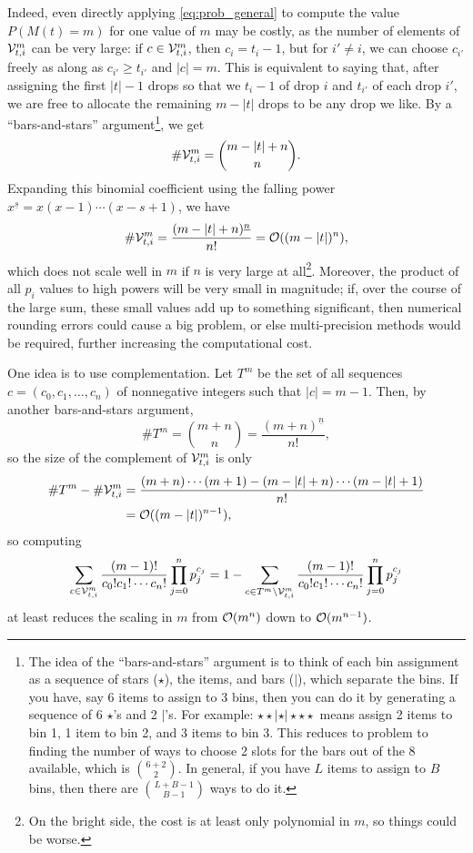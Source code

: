 \documentclass[letterpaper]{article}
\begin{document}
	Indeed, even directly applying \eqref{eq:prob_general} to compute the value $P(M(t){=}m)$ for one value of $m$ may be costly, as the number of elements of $\mathcal{V}_{t, i}^{m}$ can be very large: if $c\in\mathcal{V}_{t, i}^{m}$, then $c_i = t_i - 1$, but for $i' \ne i$, we can choose $c_{i'}$ freely as along as $c_{i'} \ge t_{i'}$ and $|c| = m$. This is equivalent to saying that, after assigning the first $|t|-1$ drops so that we $t_i-1$ of drop $i$ and $t_{i'}$ of each drop $i'$, we are free to allocate the remaining $m-|t|$ drops to be any drop we like. By a ``bars-and-stars'' argument\footnote{The idea of the ``bars-and-stars'' argument is to think of each bin assignment as a sequence of stars ($\star$), the items, and bars ($|$), which separate the bins. If you have, say 6 items to assign to 3 bins, then you can do it by generating a sequence of 6 $\star$'s and 2 $|$'s. For example: $\star\star|\star|\star\star \star$ means assign 2 items to bin 1, 1 item to bin 2, and 3 items to bin 3. This reduces to problem to finding the number of ways to choose 2 slots for the bars out of the 8 available, which is $\binom{6+2}{2}$. In general, if you have $L$ items to assign to $B$ bins, then there are $\binom{L+B-1}{B-1}$ ways to do it.}, we get
	\begin{equation}
		\#\mathcal{V}_{t, i}^{m} = \binom{m-|t| + n}{n}.
	\end{equation}
	Expanding this binomial coefficient using the falling power ${x^{\underline{s}} = x(x-1)\cdots (x-s+1)}$, we have
	\begin{equation*}
		\#\mathcal{V}_{t, i}^{m} = \frac{(m-|t|+n)^{\underline{n}}}{n!} = \mathcal{O}((m-|t|)^n),
	\end{equation*}
	which does not scale well in $m$ if $n$ is very large at all\footnote{On the bright side, the cost is at least only polynomial in $m$, so things could be worse.}. Moreover, the product of all $p_i$ values to high powers will be very small in magnitude; if, over the course of the large sum, these small values add up to something significant, then numerical rounding errors could cause a big problem, or else multi-precision methods would be required, further increasing the computational cost.
	
	One idea is to use complementation. Let $T^m$ be the set of all sequences $c = (c_0,c_1,\dots, c_n)$ of nonnegative integers such that $|c|= m-1$. Then, by another bars-and-stars argument,
	\begin{equation*}
		\#T^m = \binom{m + n}{n} = \frac{(m+n)^{\underline{n}}}{n!},
	\end{equation*}
	so the size of the complement of $\mathcal{V}_{t, i}^{m}$ is only
	\begin{align*}
		\#T^m - \#\mathcal{V}_{t, i}^{m} &= \frac{(m+n)\cdots (m+1) - (m-|t|+n)\cdots(m-|t|+1)}{n!} \\
		&= \mathcal{O}((m-|t|)^{n-1}),
	\end{align*}
	so computing 
	\begin{equation*}
		\sum_{c\in\mathcal{V}_{t, i}^{m}}\frac{(m-1)!}{c_0!c_1!\cdots c_n!}\prod_{j=0}^np_j^{c_j} = 1 - \sum_{c\in T^m \setminus \mathcal{V}_{t, i}^{m}}\frac{(m-1)!}{c_0!c_1!\cdots c_n!}\prod_{j=0}^np_j^{c_j}
	\end{equation*}
	at least reduces the scaling in $m$ from $\mathcal{O}(m^n)$ down to $\mathcal{O}(m^{n-1})$.
	
\end{document}
